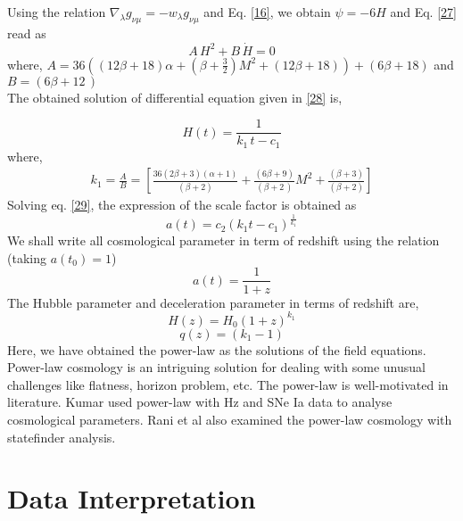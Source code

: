 Using the relation $\nabla_\lambda g_{\nu\mu}=-w_\lambda g_{\nu\mu}$ and Eq. \eqref{16}, we obtain $\psi= -6H$ and Eq. \eqref{27} read as
\begin{equation}
\label{28}
A\,H^2+B\,\dot{H}=0
\end{equation}
where,
 $A=36\left( \left(12\beta+18\right)\alpha+\left(\beta+\frac{3}{2}\right)M^2+\left(12\beta+18\right)\right) +\left(6\beta+18\right)$ and $B=\left(6\beta+12\,\right)$\\
 The obtained solution of differential equation given in \eqref{28} is,
 
\begin{equation}
\label{29}
 H(t)=\frac{1}{k_1\,t-c_1}
\end{equation}
where,
\begin{eqnarray*}
 k_{1}=\frac{A}{B}=\left[\frac{36\left(2\beta+3\right)\left(\alpha+1\right)}{\left(\beta+2\right)}+\frac{\left(6\beta+9 \right)}{\left(\beta+2\,\right)}M^2+\frac{\left(\beta+3\right)}{\left(\beta+2\right)}\right]
\end{eqnarray*}
Solving eq. \eqref{29}, the expression of the scale factor is obtained as 
\begin{equation}
\label{30}
a(t)=c_2\left(k_{1} t-c_{1} \right)^\frac{1}{k_1}
\end{equation}
We shall write all cosmological parameter in term of redshift using the relation (taking $a(t_{0})=1$)
\begin{equation}
\label{31}
a(t)=\frac{1}{1+z}
\end{equation}
The Hubble parameter and deceleration parameter in terms of redshift are,
\begin{equation}
\label{32}
H(z)= H_{0}(1+z)^{k_{1}}
\end{equation}
\begin{equation}
\label{33}
q(z)=\left(k_1-1\right)
\end{equation}
Here, we have obtained the power-law as the solutions of the field equations. Power-law cosmology is an intriguing solution for dealing  with some unusual challenges like flatness, horizon problem, etc. The power-law is well-motivated in literature. Kumar \cite{Kumar/2012}  used power-law with Hz and SNe Ia data to analyse cosmological parameters. Rani et al \cite{Rani/2015} also examined the power-law cosmology with statefinder analysis.

\section{Data Interpretation}\label{sec3}


